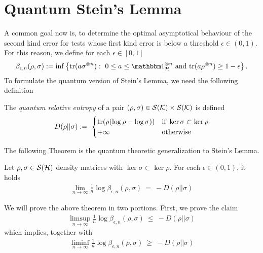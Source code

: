 \section{Quantum Stein's Lemma}
A common goal now is, to determine the optimal asymptotical behaviour of the second kind error for tests whose first kind error is below a threshold $\epsilon \in (0,1)$. 
For this reason, we define for each $\epsilon \in [0,1]$
\begin{align*}
 \beta_{\epsilon,n}(\rho, \sigma) := \inf\left\{\tr(a \sigma^{\otimes n}): 
 \ 0 \leq a \leq \bbmeins_\cH^{\otimes n} \ \text{and} \ \tr(a \rho^{\otimes n}) \geq 1 - \epsilon \right\}.
\end{align*}
To formulate the quantum version of Stein's Lemma, we need the following definition
\begin{definition} \label{def:q_rel_ent}
 The \emph{quantum relative entropy} of a pair $(\rho,\sigma) \in {\mathcal S}({\mathcal K}) \times {\mathcal S}({\mathcal K})$ is defined
 \begin{align*}
  D(\rho||\sigma) := \ \begin{cases}
                        \mathrm{tr}(\rho(\log \rho - \log \sigma)) & \text{if} \ \ker{\sigma} \subset \ker{\rho} \\
                        + \infty & \text{otherwise}
                       \end{cases}
 \end{align*}
\end{definition}
The following Theorem is the quantum theoretic generalization to Stein's Lemma.
\begin{theorem} \label{thm:q_stein_lemma}
Let $\rho, \sigma \in {\mathcal S}({\mathcal H})$ density matrices with $\ker \sigma \subset \ker \rho$. For each $\epsilon \in (0,1)$, it holds
\begin{align*}
 \underset{n \rightarrow \infty}{\lim} \frac{1}{n} \log \beta_{\epsilon,n}(\rho, \sigma) \ = \ -D(\rho||\sigma)
\end{align*}
\end{theorem}
We will prove the above theorem in two portions. First, we prove the claim
\begin{align}
 \underset{n \rightarrow \infty}{\limsup} \frac{1}{n} \log \beta_{\epsilon,n}(\rho, \sigma) \ \leq \ -D(\rho||\sigma)  \label{thm:q_stein_lemma_achiev}
\end{align}
which implies, together with 
\begin{align}
 \underset{n \rightarrow \infty}{\liminf} \frac{1}{n} \log \beta_{\epsilon,n}(\rho, \sigma) \ \geq \ -D(\rho||\sigma) \label{thm:q_stein_lemma_converse}
\end{align}
